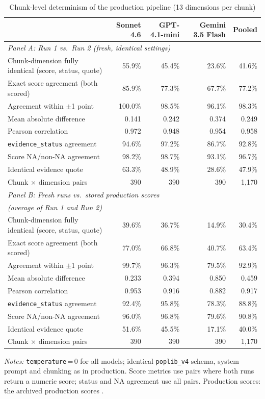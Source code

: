 \begin{table}[ht]
\centering
\caption{Chunk-level determinism of the production pipeline (13 dimensions per chunk)}
\label{tab:verify_determinism}
\scriptsize
\begin{tabular}{lrrrr}
\toprule
 & Sonnet 4.6 & GPT-4.1-mini & Gemini 3.5 Flash & Pooled \\
\midrule
\multicolumn{5}{l}{\textit{Panel A: Run 1 vs.\ Run 2 (fresh, identical settings)}} \\
Chunk-dimension fully identical (score, status, quote) & 55.9\% & 45.4\% & 23.6\% & 41.6\% \\
Exact score agreement (both scored) & 85.9\% & 77.3\% & 67.7\% & 77.2\% \\
Agreement within $\pm$1 point & 100.0\% & 98.5\% & 96.1\% & 98.3\% \\
Mean absolute difference & 0.141 & 0.242 & 0.374 & 0.249 \\
Pearson correlation & 0.972 & 0.948 & 0.954 & 0.958 \\
\texttt{evidence\_status} agreement & 94.6\% & 97.2\% & 86.7\% & 92.8\% \\
Score NA/non-NA agreement & 98.2\% & 98.7\% & 93.1\% & 96.7\% \\
Identical evidence quote & 63.3\% & 48.9\% & 28.6\% & 47.9\% \\
Chunk $\times$ dimension pairs & 390 & 390 & 390 & 1{,}170 \\
\midrule
\multicolumn{5}{l}{\textit{Panel B: Fresh runs vs.\ stored production scores}} \\
\multicolumn{5}{l}{\textit{(average of Run 1 and Run 2)}} \\
Chunk-dimension fully identical (score, status, quote) & 39.6\% & 36.7\% & 14.9\% & 30.4\% \\
Exact score agreement (both scored) & 77.0\% & 66.8\% & 40.7\% & 63.4\% \\
Agreement within $\pm$1 point & 99.7\% & 96.3\% & 79.5\% & 92.9\% \\
Mean absolute difference & 0.233 & 0.394 & 0.850 & 0.459 \\
Pearson correlation & 0.953 & 0.916 & 0.882 & 0.917 \\
\texttt{evidence\_status} agreement & 92.4\% & 95.8\% & 78.3\% & 88.8\% \\
Score NA/non-NA agreement & 96.0\% & 96.8\% & 79.6\% & 90.8\% \\
Identical evidence quote & 51.6\% & 45.5\% & 17.1\% & 40.0\% \\
Chunk $\times$ dimension pairs & 390 & 390 & 390 & 1{,}170 \\
\bottomrule
\end{tabular}
\par\smallskip\parbox{0.95\linewidth}{\scriptsize\textit{Notes:} \texttt{temperature}\,=\,0 for all models; identical \texttt{poplib\_v4} schema, system prompt and chunking as in production. Score metrics use pairs where both runs return a numeric score; status and NA agreement use all pairs. Production scores: 
the archived production scores
.}
\end{table}
